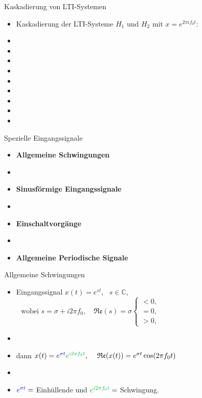 \documentclass[14pt, aspectratio=169, handout]{beamer}
\begin{document}
\begin{frame}{Kaskadierung von LTI-Systemen}
    \begin{itemize}
        \item Kaskadierung der LTI-Systeme $H_1$ und $H_2$ mit $x=e^{2 \pi i f_0 t}$:
        \item[] 
        \item[] 
        \item[] 
        \item[] 
        \item[] 
        \item[] 
        \item[] 
        \item[] 
        \item[] %
    \end{itemize}
\end{frame}

\begin{frame}{Spezielle Eingangssignale}
    \begin{itemize}
        \item \textbf{Allgemeine Schwingungen}
        \item[] 
        \item \textbf{Sinusförmige Eingangssignale}
        \item[] 
        \item \textbf{Einschaltvorgänge}
        \item[]
        \item \textbf{Allgemeine Periodische Signale}
    \end{itemize}
\end{frame}

\begin{frame}{Allgemeine Schwingungen}
    \begin{itemize}
        \item Eingangssignal $x(t) = \displaystyle e^{st}, \hspace{8pt} s \in \mathbb{C}$,
$ \hspace{8pt} \text{wobei }s = \sigma + i 2 \pi f_0, \hspace{12pt} \mathfrak{Re}(s) = \sigma \begin{cases}
    < 0, \\
    = 0, \\
    > 0,
\end{cases}$
    \item[] 
    \item[] dann $x(t) = \textcolor{myblue}{e^{\sigma t}}\textcolor{mygreen}{e^{i 2 \pi f_0 t}}, \hspace{12pt} \mathfrak{Re}(x(t)) = e^{\sigma t}\cos (2\pi f_0 t)$
    \item[] 
    \item $\textcolor{myblue}{e^{\sigma t}} =$ \textcolor{myblue}{Einhüllende} und $\textcolor{mygreen}{e^{i 2 \pi f_0 t}} =$ \textcolor{mygreen}{Schwingung}.
    \end{itemize}
\end{frame}
\end{document}
